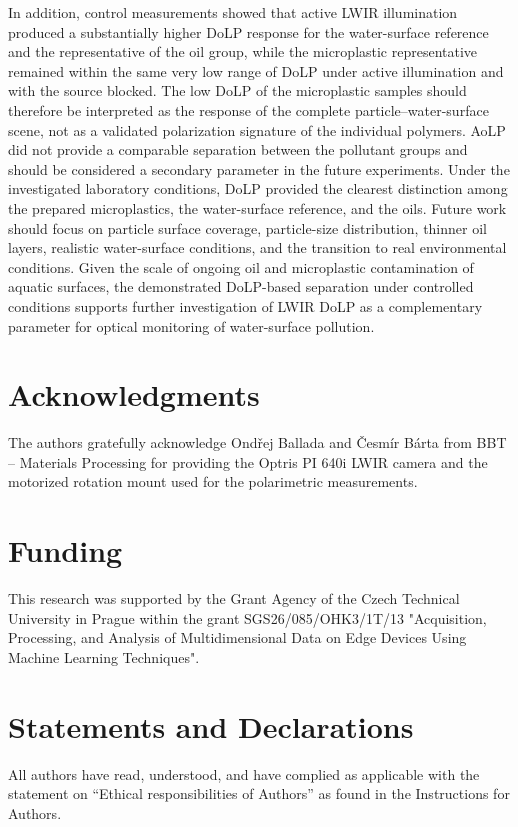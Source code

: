 \documentclass[pdflatex,sn-apa]{sn-jnl}
\begin{document}
In addition, control measurements showed that active LWIR illumination produced a substantially higher DoLP response for the water-surface reference and the representative of the oil group, while the microplastic representative remained within the same very low range of DoLP under active illumination and with the source blocked. The low DoLP of the microplastic samples should therefore be interpreted as the response of the complete particle--water-surface scene, not as a validated polarization signature of the individual polymers. AoLP did not provide a comparable separation between the pollutant groups and should be considered a secondary parameter in the future experiments. Under the investigated laboratory conditions, DoLP provided the clearest distinction among the prepared microplastics, the water-surface reference, and the oils. Future work should focus on particle surface coverage, particle-size distribution, thinner oil layers, realistic water-surface conditions, and the transition to real environmental conditions. Given the scale of ongoing oil and microplastic contamination of aquatic surfaces, the demonstrated DoLP-based separation under controlled conditions supports further investigation of LWIR DoLP as a complementary parameter for optical monitoring of water-surface pollution. 


\backmatter

\section*{Acknowledgments}
The authors gratefully acknowledge Ondřej Ballada and Česmír Bárta from BBT -- Materials Processing for providing the Optris PI 640i LWIR camera and the motorized rotation mount used for the polarimetric measurements.

\section*{Funding}
This research was supported by the Grant Agency of the Czech Technical University in Prague within the grant SGS26/085/OHK3/1T/13 "Acquisition, Processing, and Analysis of Multidimensional Data on Edge Devices Using Machine Learning Techniques".


\section*{Statements and Declarations}

All authors have read, understood, and have complied as applicable
with the statement on ``Ethical responsibilities of Authors''
as found in the Instructions for Authors.
\end{document}
